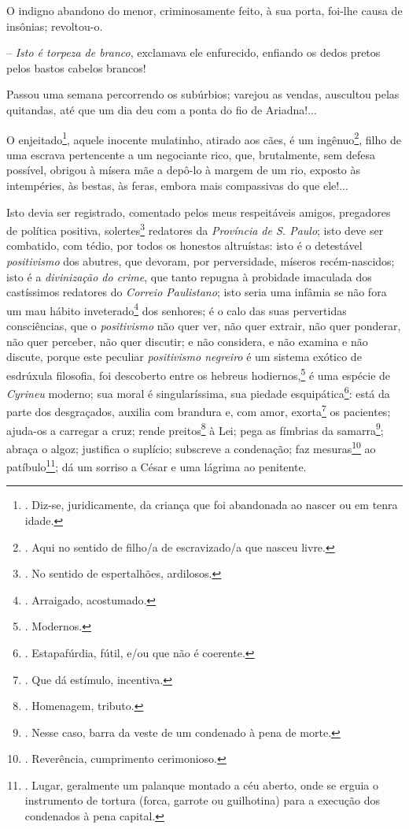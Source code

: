 O indigno abandono do menor, criminosamente feito, à sua porta, foi-lhe
causa de insônias; revoltou-o.

-- \emph{Isto é torpeza de branco}, exclamava ele enfurecido, enfiando
os dedos pretos pelos bastos cabelos brancos!

Passou uma semana percorrendo os subúrbios; varejou as vendas, auscultou
pelas quitandas, até que um dia deu com a ponta do fio de Ariadna!...

O enjeitado\footnote{. Diz-se, juridicamente, da criança que foi
  abandonada ao nascer ou em tenra idade.}, aquele inocente mulatinho,
atirado aos cães, é um ingênuo\footnote{. Aqui no sentido de filho/a de
  escravizado/a que nasceu livre.}, filho de uma escrava pertencente a
um negociante rico, que, brutalmente, sem defesa possível, obrigou à
mísera mãe a depô-lo à margem de um rio, exposto às intempéries, às
bestas, às feras, embora mais compassivas do que ele!...

Isto devia ser registrado, comentado pelos meus respeitáveis amigos,
pregadores de política positiva, solertes\footnote{. No sentido de
  espertalhões, ardilosos.} redatores da \emph{Província de S. Paulo};
isto deve ser combatido, com tédio, por todos os honestos altruístas:
isto é o detestável \emph{positivismo} dos abutres, que devoram, por
perversidade, míseros recém-nascidos; isto é a \emph{divinização do
crime}, que tanto repugna à probidade imaculada dos castíssimos
redatores do \emph{Correio Paulistano}; isto seria uma infâmia se não
fora um mau hábito inveterado\footnote{. Arraigado, acostumado.} dos
senhores; é o calo das suas pervertidas consciências, que o
\emph{positivismo} não quer ver, não quer extrair, não quer ponderar,
não quer perceber, não quer discutir; e não considera, e não examina e
não discute, porque este peculiar \emph{positivismo negreiro} é um
sistema exótico de esdrúxula filosofia, foi descoberto entre os hebreus
hodiernos,\footnote{. Modernos.} é uma espécie de \emph{Cyrineu}
moderno; sua moral é singularíssima, sua piedade esquipática\footnote{.
  Estapafúrdia, fútil, e/ou que não é coerente.}: está da parte dos
desgraçados, auxilia com brandura e, com amor, exorta\footnote{. Que dá
  estímulo, incentiva.} os pacientes; ajuda-os a carregar a cruz; rende
preitos\footnote{. Homenagem, tributo.} à Lei; pega as fímbrias da
samarra\footnote{. Nesse caso, barra da veste de um condenado à pena de
  morte.}; abraça o algoz; justifica o suplício; subscreve a condenação;
faz mesuras\footnote{. Reverência, cumprimento cerimonioso.} ao
patíbulo\footnote{. Lugar, geralmente um palanque montado a céu aberto,
  onde se erguia o instrumento de tortura (forca, garrote ou guilhotina)
  para a execução dos condenados à pena capital.}; dá um sorriso a César
e uma lágrima ao penitente.

